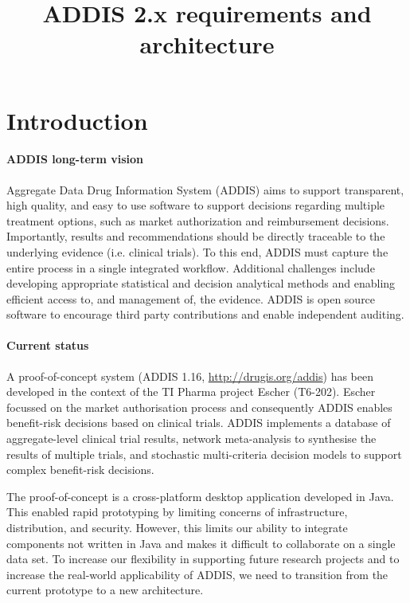 \documentclass[a4paper]{article}
\title{ADDIS 2.x requirements and architecture}
\begin{document}
\maketitle

\section{Introduction}

\paragraph{ADDIS long-term vision}
Aggregate Data Drug Information System (ADDIS) aims to support transparent, high quality, and easy to use software to support decisions regarding multiple treatment options, such as market authorization and reimbursement decisions.
Importantly, results and recommendations should be directly traceable to the underlying evidence (i.e. clinical trials).
To this end, ADDIS must capture the entire process in a single integrated workflow.
Additional challenges include developing appropriate statistical and decision analytical methods and enabling efficient access to, and management of, the evidence.
ADDIS is open source software to encourage third party contributions and enable independent auditing.

\paragraph{Current status}
A proof-of-concept system (ADDIS 1.16, \url{http://drugis.org/addis}) has been developed in the context of the TI Pharma project Escher (T6-202).
Escher focussed on the market authorisation process and consequently ADDIS enables benefit-risk decisions based on clinical trials.
ADDIS implements a database of aggregate-level clinical trial results, network meta-analysis to synthesise the results of multiple trials, and stochastic multi-criteria decision models to support complex benefit-risk decisions.

The proof-of-concept is a cross-platform desktop application developed in Java.
This enabled rapid prototyping by limiting concerns of infrastructure, distribution, and security.
However, this limits our ability to integrate components not written in Java and makes it difficult to collaborate on a single data set.
To increase our flexibility in supporting future research projects and to increase the real-world applicability of ADDIS, we need to transition from the current prototype to a new architecture.
\end{document}
